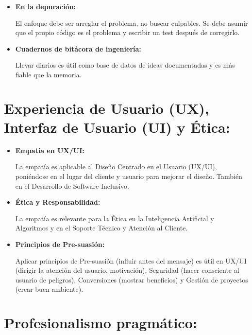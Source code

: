 \documentclass[a4paper,12pt,twoside]{article}
\begin{document}
\begin{itemize}
    \item \textbf{En la depuración:} 
    
    El enfoque debe ser arreglar el problema, no buscar culpables. Se debe asumir que el
        propio código es el problema y escribir un test después de corregirlo.

    \item \textbf{Cuadernos de bitácora de ingeniería:} 
    
    Llevar diarios es útil como base de datos de ideas documentadas
        y es más fiable que la memoria.
\end{itemize}

\section{Experiencia de Usuario (UX), Interfaz de Usuario (UI) y Ética:}
\begin{itemize}

    \begin{figure}[H]
        \centering
        \texttt{[image: ./images/interfazUX.jpg]}
        \caption{UX/UI y Ética en Ingeniería del Software}
        \label{fig:ux_ui}
    \end{figure}
    \item \textbf{Empatía en UX/UI:} 
    
    La empatía es aplicable al Diseño Centrado en el Usuario (UX/UI), poniéndose en el lugar del cliente y usuario para mejorar el diseño.
     También en el Desarrollo de Software Inclusivo.

    \item \textbf{Ética y Responsabilidad:} 
    
    La empatía es relevante para la Ética en la Inteligencia Artificial y Algoritmos y en el Soporte Técnico y Atención al Cliente.

    \item \textbf{Principios de Pre-suasión:} 
    
    Aplicar principios de Pre-suasión (influir antes del mensaje) es útil en UX/UI (dirigir la atención del usuario, motivación), 
    Seguridad (hacer consciente al usuario de peligros), Conversiones (mostrar beneficios) y Gestión de proyectos (crear buen ambiente).

\end{itemize}

\section{Profesionalismo pragmático:}
\end{document}
